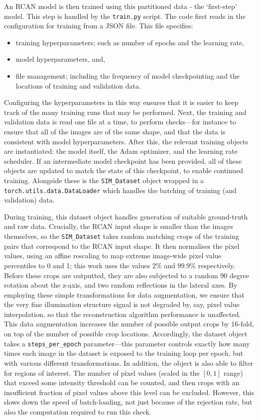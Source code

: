 \documentclass[12pt]{article}
\begin{document}
An RCAN model is then trained using this partitioned data - the `first-step' model.
This step is handled by the \texttt{train.py} script.
The code first reads in the configuration for training from a JSON file.
This file specifies:
\begin{itemize}
    \item training hyperparameters; such as number of epochs and the learning rate,
    \item model hyperparameters, and,
    \item file management; including the frequency of model checkpointing and the locations of training and validation data.
\end{itemize}
Configuring the hyperparameters in this way ensures that it is easier to keep track of the many training runs that may be performed.
Next, the training and validation data is read one file at a time, to perform checks---for instance to ensure that all of the images are of the same shape,
and that the data is consistent with model hyperparameters.
After this, the relevant training objects are instantiated: the model itself, the Adam optimizer, and the learning rate scheduler.
If an intermediate model checkpoint has been provided, all of these objects are updated to match the state of this checkpoint,
to enable continued training.
Alongside these is the \texttt{SIM\_Dataset} object wrapped in a \texttt{torch.utils.data.DataLoader} which handles the batching of training (and validation) data.

During training, this dataset object handles generation of suitable ground-truth and raw data.
Crucially, the RCAN input shape is smaller than the images themselves,
so the \texttt{SIM\_Dataset} takes random matching crops of the training pairs that correspond to the RCAN input shape.
It then normalises the pixel values, using an affine rescaling to map extreme image-wide pixel value percentiles to 0 and 1;
this work uses the values 2\% and 99.9\% respectively.
Before these crops are outputted, they are also subjected to a random 90 degree rotation about the z-axis,
and two random reflections in the lateral axes.
By employing these simple transformations for data augmentation,
we ensure that the very fine illumination structure signal is not degraded by, say, pixel value interpolation,
so that the reconstruction algorithm performance is unaffected.
This data augmentation increases the number of possible output crops by 16-fold,
on top of the number of possible crop locations.
Accordingly, the dataset object takes a \texttt{steps\_per\_epoch} parameter---this
parameter controls exactly how many times each image in the dataset is exposed to the training loop per epoch,
but with various different transformations.
In addition, the object is also able to filter for regions of interest.
The number of pixel values (scaled in the $[0, 1]$ range) that exceed some intensity threshold can be counted,
and then crops with an insufficient fraction of pixel values above this level can be excluded.
However, this slows down the speed of batch-loading, not just because of the rejection rate,
but also the computation required to run this check.
\end{document}

